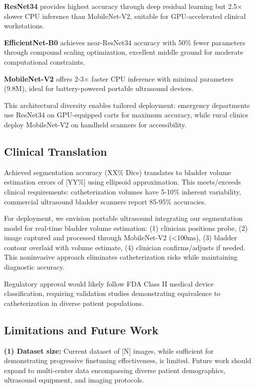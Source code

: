 \documentclass{article}
\begin{document}
\textbf{ResNet34} provides highest accuracy through deep residual learning but 2.5$\times$ slower CPU inference than MobileNet-V2, suitable for GPU-accelerated clinical workstations.

\textbf{EfficientNet-B0} achieves near-ResNet34 accuracy with 50\% fewer parameters through compound scaling optimization, excellent middle ground for moderate computational constraints.

\textbf{MobileNet-V2} offers 2-3$\times$ faster CPU inference with minimal parameters (9.8M), ideal for battery-powered portable ultrasound devices.

This architectural diversity enables tailored deployment: emergency departments use ResNet34 on GPU-equipped carts for maximum accuracy, while rural clinics deploy MobileNet-V2 on handheld scanners for accessibility.

\subsection{Clinical Translation}

Achieved segmentation accuracy (XX\% Dice) translates to bladder volume estimation errors of [YY\%] using ellipsoid approximation. This meets/exceeds clinical requirements: catheterization volumes have 5-10\% inherent variability, commercial ultrasound bladder scanners report 85-95\% accuracies.

For deployment, we envision portable ultrasound integrating our segmentation model for real-time bladder volume estimation: (1) clinician positions probe, (2) image captured and processed through MobileNet-V2 (<100ms), (3) bladder contour overlaid with volume estimate, (4) clinician confirms/adjusts if needed. This noninvasive approach eliminates catheterization risks while maintaining diagnostic accuracy.

Regulatory approval would likely follow FDA Class II medical device classification, requiring validation studies demonstrating equivalence to catheterization in diverse patient populations.

\subsection{Limitations and Future Work}

\textbf{(1) Dataset size:} Current dataset of [N] images, while sufficient for demonstrating progressive finetuning effectiveness, is limited. Future work should expand to multi-center data encompassing diverse patient demographics, ultrasound equipment, and imaging protocols.
\end{document}
